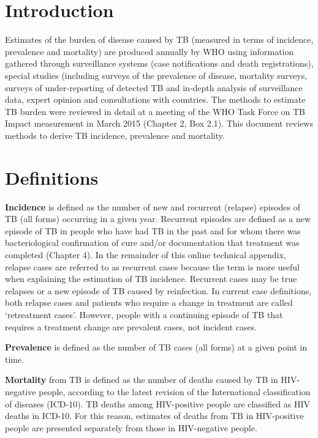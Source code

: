 \tableofcontents

\section{Introduction}

Estimates of the burden of disease caused by TB (measured in terms of incidence, prevalence and mortality) are produced annually by WHO using information gathered through surveillance systems (case notifications and death registrations), special studies (including surveys of the prevalence of disease, mortality surveys, surveys of under-reporting of detected TB and in-depth analysis of surveillance data, expert opinion and consultations with countries. The methods to estimate TB burden were reviewed in detail at a meeting of the WHO Task Force on TB Impact measurement in March 2015 (Chapter 2, Box 2.1). This document reviews methods to derive TB incidence, prevalence and mortality.

\section{Definitions}
\textbf{Incidence} is defined as the number of new and recurrent (relapse) episodes of TB (all forms) occurring in a given year. Recurrent episodes are defined as a new episode of TB in people who have had TB in the past and for whom there was bacteriological confirmation of cure and/or documentation that treatment was completed (Chapter 4). In the remainder of this online technical appendix, relapse cases are referred to as recurrent cases because the term is more useful when explaining the estimation of TB incidence. Recurrent cases may be true relapses or a new episode of TB caused by reinfection. In current case definitions, both relapse cases and patients who require a change in treatment are called ‘retreatment cases’. However, people with a continuing episode of TB that requires a treatment change are prevalent cases, not incident cases.

\textbf{Prevalence} is defined as the number of TB cases (all forms) at a given point in time. 

\textbf{Mortality} from TB is defined as the number of deaths caused by TB in HIV-negative people, according to the latest revision of the International classification of diseases (ICD-10). TB deaths among HIV-positive people are classified as HIV deaths in ICD-10. For this reason, estimates of deaths from TB in HIV-positive people are presented separately from those in HIV-negative people.

